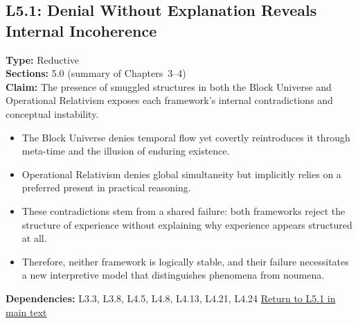 \documentclass[12pt]{book}
\newcommand{\returnlink}[1]{\hyperref[logic:#1]{Return to #1 in main text}\xspace}
\begin{document}
\subsection*{L5.1: Denial Without Explanation Reveals Internal Incoherence}
\label{appendix:L5.1}
\textbf{Type:} Reductive \\
\textbf{Sections:} 5.0 (summary of Chapters~3–4) \\
\textbf{Claim:} The presence of smuggled structures in both the Block Universe and Operational Relativism exposes each framework's internal contradictions and conceptual instability.
\begin{itemize}
  \item The Block Universe denies temporal flow yet covertly reintroduces it through meta-time and the illusion of enduring existence.
  \item Operational Relativism denies global simultaneity but implicitly relies on a preferred present in practical reasoning.
  \item These contradictions stem from a shared failure: both frameworks reject the structure of experience without explaining why experience appears structured at all.
  \item Therefore, neither framework is logically stable, and their failure necessitates a new interpretive model that distinguishes phenomena from noumena.
\end{itemize}
\textbf{Dependencies:} L3.3, L3.8, L4.5, L4.8, L4.13, L4.21, L4.24
\returnlink{L5.1}
\end{document}
